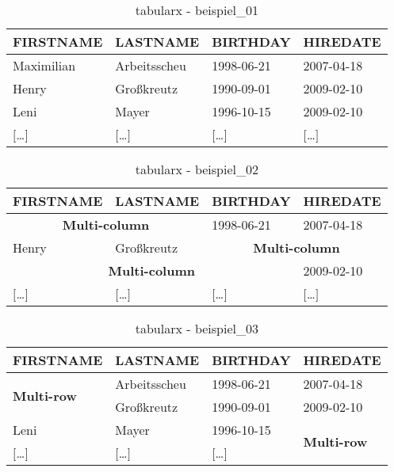\begin{table}[H]
  \begin{tabularx}{\textwidth}{X|X|X|X}
    \textbf{FIRSTNAME} & \textbf{LASTNAME} & \textbf{BIRTHDAY} & \textbf{HIREDATE} \\
    \hline\hline
    Maximilian & Arbeitsscheu & 1998-06-21 & 2007-04-18 \\
    Henry & Großkreutz & 1990-09-01 & 2009-02-10 \\
    Leni & Mayer & 1996-10-15 & 2009-02-10 \\
    $[$\dots$]$ & $[$\dots$]$ & $[$\dots$]$ & $[$\dots$]$ \\
  \end{tabularx}
  \caption{tabularx - beispiel\_01}
  \label{tbl:beispiel_01}
\end{table}

\begin{table}[H]
  \begin{tabularx}{\textwidth}{X|X|X|X}
    \textbf{FIRSTNAME} & \textbf{LASTNAME} & \textbf{BIRTHDAY} & \textbf{HIREDATE} \\
    \hline\hline
    \multicolumn{2}{c|}{\textbf{Multi-column}} & 1998-06-21 & 2007-04-18 \\
    Henry & Großkreutz & \multicolumn{2}{c}{\textbf{Multi-column}} \\
    \multicolumn{3}{c|}{\textbf{Multi-column}} & 2009-02-10 \\
    $[$\dots$]$ & $[$\dots$]$ & $[$\dots$]$ & $[$\dots$]$ \\
  \end{tabularx}
  \caption{tabularx - beispiel\_02}
  \label{tbl:beispiel_02}
\end{table}


\begin{table}[H]
  \ttfamily
  \begin{tabularx}{\textwidth}{X|X|X|X}
    \textbf{FIRSTNAME} & \textbf{LASTNAME} & \textbf{BIRTHDAY} & \textbf{HIREDATE} \\
    \hline\hline
    \multirow{2}{*}{\textbf{Multi-row}} & Arbeitsscheu & 1998-06-21 & 2007-04-18 \\
    & Großkreutz & 1990-09-01 & 2009-02-10 \\
    Leni & Mayer & 1996-10-15 & \multirow{2}{*}{\textbf{Multi-row}} \\
    $[$\dots$]$ & $[$\dots$]$ & $[$\dots$]$ & \\
    \hline
  \end{tabularx}
  \caption{tabularx - beispiel\_03}
  \label{tbl:beispiel_03}
\end{table}


